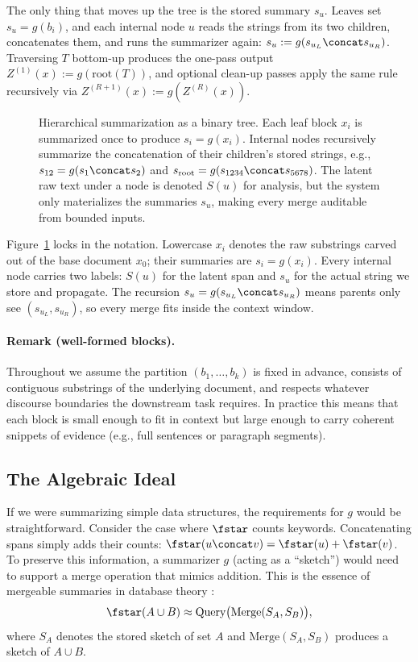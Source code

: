 The only thing that moves up the tree is the stored summary $s_u$. Leaves set $s_u = g(b_i)$, and each internal node $u$ reads the strings from its two children, concatenates them, and runs the summarizer again: $s_u := g(s_{u_L} \concat s_{u_R})$. Traversing $T$ bottom-up produces the one-pass output $Z^{(1)}(x) := g(\text{root}(T))$, and optional clean-up passes apply the same rule recursively via $Z^{(R+1)}(x) := g(Z^{(R)}(x))$.

\begin{figure}[t]
    \centering
    
    \caption{Hierarchical summarization as a binary tree. Each leaf block $x_i$ is summarized once to produce $s_i = g(x_i)$. Internal nodes recursively summarize the concatenation of their children's stored strings, e.g., $s_{12} = g(s_1 \concat s_2)$ and $s_{\mathrm{root}} = g(s_{1234} \concat s_{5678})$. The latent raw text under a node is denoted $S(u)$ for analysis, but the system only materializes the summaries $s_u$, making every merge auditable from bounded inputs.}
    \label{fig:hierarchical_summarization}
\end{figure}

Figure~\ref{fig:hierarchical_summarization} locks in the notation. Lowercase $x_i$ denotes the raw substrings carved out of the base document $x_0$; their summaries are $s_i = g(x_i)$. Every internal node carries two labels: $S(u)$ for the latent span and $s_u$ for the actual string we store and propagate. The recursion $s_u = g(s_{u_L} \concat s_{u_R})$ means parents only see $(s_{u_L}, s_{u_R})$, so every merge fits inside the context window.

\paragraph{Remark (well-formed blocks).}
Throughout we assume the partition $(b_1, \ldots, b_k)$ is fixed in advance, consists of contiguous substrings of the underlying document, and respects whatever discourse boundaries the downstream task requires. In practice this means that each block is small enough to fit in context but large enough to carry coherent snippets of evidence (e.g., full sentences or paragraph segments).

\subsection{The Algebraic Ideal}

If we were summarizing simple data structures, the requirements for $g$ would be straightforward. Consider the case where $\fstar$ counts keywords. Concatenating spans simply adds their counts: $\fstar(u \concat v) = \fstar(u) + \fstar(v)$. To preserve this information, a summarizer $g$ (acting as a ``sketch'') would need to support a merge operation that mimics addition. This is the essence of mergeable summaries in database theory \citep{Agarwal2013MergeableTODS}:
\[
\fstar(A \cup B) \approx \text{Query}\big(\text{Merge}(S_A, S_B)\big),
\]
where $S_A$ denotes the stored sketch of set $A$ and $\text{Merge}(S_A, S_B)$ produces a sketch of $A \cup B$.

